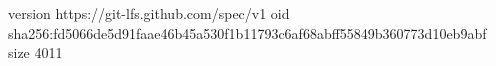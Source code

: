 version https://git-lfs.github.com/spec/v1
oid sha256:fd5066de5d91faae46b45a530f1b11793c6af68abff55849b360773d10eb9abf
size 4011
